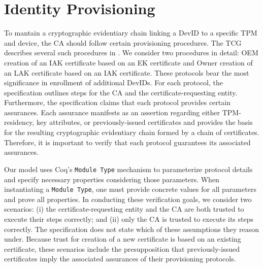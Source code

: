 \documentclass[runningheads]{llncs}
\begin{document}

%
%
%
\section{Identity Provisioning}

To mantain a cryptographic evidentiary chain linking a DevID to a
specific TPM and device, the CA should follow certain provisioning
procedures. The TCG describes several such procedures in
\citet{DevIDSpec-TCG}.  We consider two procedures in detail: OEM
creation of an IAK certificate based on an EK certificate and Owner
creation of an LAK certificate based on an IAK certificate. These
protocols bear the most significance in enrollment of additional
DevIDs. For each protocol, the specification outlines steps for the CA
and the certificate-requesting entity.  Furthermore, the
specification claims that each protocol provides certain
assurances. Each assurance manifests as an assertion regarding either
TPM-residency, key attributes, or previously-issued certificates and
provides the basis for the resulting cryptographic evidentiary chain
formed by a chain of certificates. Therefore, it is important to
verify that each protocol guarantees its associated assurances.

Our model uses Coq's \verb|Module Type| mechanism to parameterize
protocol details and specify necessary properties considering those
parameters.  When instantiating a \verb|Module Type|, one must provide
concrete values for all parameters and prove all properties.  In
conducting these verification goals, we consider two scenarios: (i)
the certificate-requesting entity and the CA are both trusted to
execute their steps correctly; and (ii) only the CA is trusted to
execute its steps correctly. The specification does not state which of
these assumptions they reason under.  Because trust for creation of a
new certificate is based on an existing certificate, these scenarios
include the presupposition that previously-issued certificates imply
the associated assurances of their provisioning protocols.
\end{document}
